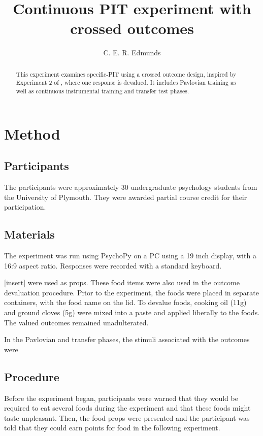 \documentclass[12pt]{article}
\title{Continuous PIT experiment with crossed outcomes}
\author{C. E. R. Edmunds}
\date{}%
\begin{document}
\maketitle
\doublespacing
\newpage
	\begin{abstract}
		This experiment examines specific-PIT using a crossed outcome design,
inspired by Experiment 2 of , where one response is
devalued. It includes Pavlovian training as well as continuous instrumental
training and transfer test phases. 
	\end{abstract}


\section{Method}
\subsection{Participants}
The participants were approximately $30$ undergraduate psychology students from
the University of Plymouth. They were awarded partial course credit for their
participation. 

\subsection{Materials}
The experiment was run using PsychoPy \cite{Peirce2007, Peirce2009} on a PC
using a 19 inch display, with a 16:9 aspect ratio. Responses were recorded with
a standard keyboard.

[insert] were used as props. These food items were also used in the outcome
devaluation procedure. Prior to the experiment, the foods were placed in
separate containers, with the food name on the lid. To devalue foods, cooking
oil (11g) and ground cloves (5g) were mixed into a paste and applied liberally
to the foods. The valued outcomes remained unadulterated. 

In the Pavlovian and transfer phases, the stimuli associated with the outcomes
were 


\subsection{Procedure}
Before the experiment began, participants were warned that they would be
required to eat several foods during the experiment and that these foods might
taste unpleasant. Then, the food props were presented and the participant was
told that they could earn points for food in the following experiment.
\end{document}
